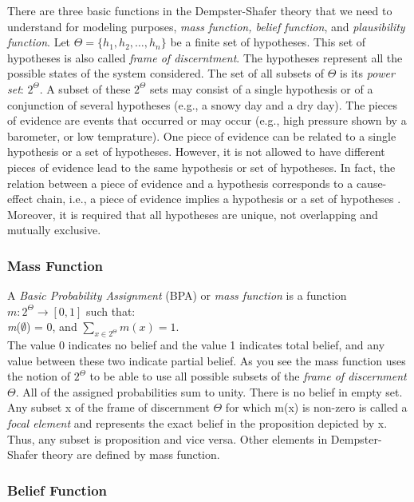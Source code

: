 \documentclass[11pt]{article}
\begin{document}
There are three basic functions in the Dempster-Shafer theory that we need to
understand for modeling purposes, \textit{mass function, belief function}, and
\textit{plausibility function}. Let $\Theta=\{h_1,h_2, \ldots, h_n\}$ be a
finite set of hypotheses. This set of hypotheses is also called \textit{frame of
discerntment}. The hypotheses represent all the possible states of the system
considered. The set of all subsets of $\Theta$ is its \textit{power set}:
$2^\Theta$. A subset of these $2^\Theta$ sets may consist of a single hypothesis
or of a conjunction of several hypotheses (e.g., a snowy day and a dry day). The
pieces of evidence are events that occurred or may occur (e.g., high pressure
shown by a barometer, or low temprature). One piece of evidence can be related
to a single hypothesis or a set of hypotheses. However, it is not allowed to
have different pieces of evidence lead to the same hypothesis or set of
hypotheses. In fact, the relation between a piece of evidence and a hypothesis
corresponds to a cause-effect chain, i.e., a piece of evidence implies a
hypothesis or a set of hypotheses \cite{kay:dst-reliability}. Moreover, it is
required that all hypotheses are unique, not overlapping and mutually exclusive.

\subsubsection{Mass Function}

A \textit{Basic Probability Assignment} (BPA) or \textit{mass function}
is a function $m:2^\Theta\rightarrow[0,1]$ such that:\\

\textit{m}($\emptyset$) = 0, and $\sum\limits_{x\in2^\Theta}m(x) =1$.\\

The value 0 indicates no belief and the value 1 indicates total belief, and
any value between these two indicate partial belief. As you see the mass
function uses the notion of $2^\Theta$ to be able to use all possible subsets of
the \textit{frame of discernment} $\Theta$. All of the assigned probabilities
sum to unity. There is no belief in empty set. Any subset x of the frame of
discernment $\Theta$ for which m(x) is non-zero is called a \textit{focal
element} and represents the exact belief in the proposition depicted by x. Thus,
any subset is proposition and vice versa. Other elements in Dempster-Shafer
theory are defined by mass function. 

\subsubsection{Belief Function}
\end{document}

